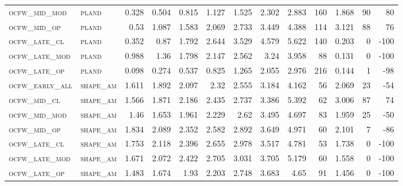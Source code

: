 \begin{landscape}
\begin{center}
\begin{footnotesize}
\begin{longtable}{llrrrrrrrr|rrr}
\textsc{ocfw\_mid\_mod  } & \textsc{pland     }   & 0.328    & 0.504    & 0.815    & 1.127    & 1.525    & 2.302    & 2.883    & 160    & 1.868         & 90            & 80              \\
\textsc{ocfw\_mid\_op   } & \textsc{pland     }   & 0.53     & 1.087    & 1.583    & 2.069    & 2.733    & 3.449    & 4.388    & 114    & 3.121         & 88            & 76              \\
\textsc{ocfw\_late\_cl  } & \textsc{pland     }   & 0.352    & 0.87     & 1.792    & 2.644    & 3.529    & 4.579    & 5.622    & 140    & 0.203         & 0             & -100            \\
\textsc{ocfw\_late\_mod } & \textsc{pland     }   & 0.988    & 1.36     & 1.798    & 2.147    & 2.562    & 3.24     & 3.958    & 88     & 0.131         & 0             & -100            \\
\textsc{ocfw\_late\_op  } & \textsc{pland     }   & 0.098    & 0.274    & 0.537    & 0.825    & 1.265    & 2.055    & 2.976    & 216    & 0.144         & 1             & -98             \\
\textsc{ocfw\_early\_all} & \textsc{shape\_am }   & 1.611    & 1.892    & 2.097    & 2.32     & 2.555    & 3.184    & 4.162    & 56     & 2.069         & 23            & -54             \\
\textsc{ocfw\_mid\_cl   } & \textsc{shape\_am }   & 1.566    & 1.871    & 2.186    & 2.435    & 2.737    & 3.386    & 5.392    & 62     & 3.006         & 87            & 74              \\
\textsc{ocfw\_mid\_mod  } & \textsc{shape\_am }   & 1.46     & 1.653    & 1.961    & 2.229    & 2.62     & 3.495    & 4.697    & 83     & 1.959         & 25            & -50             \\
\textsc{ocfw\_mid\_op   } & \textsc{shape\_am }   & 1.834    & 2.089    & 2.352    & 2.582    & 2.892    & 3.649    & 4.971    & 60     & 2.101         & 7             & -86             \\
\textsc{ocfw\_late\_cl  } & \textsc{shape\_am }   & 1.753    & 2.118    & 2.396    & 2.655    & 2.978    & 3.517    & 4.781    & 53     & 1.738         & 0             & -100            \\
\textsc{ocfw\_late\_mod } & \textsc{shape\_am }   & 1.671    & 2.072    & 2.422    & 2.705    & 3.031    & 3.705    & 5.179    & 60     & 1.558         & 0             & -100            \\
\textsc{ocfw\_late\_op  } & \textsc{shape\_am }   & 1.483    & 1.674    & 1.93     & 2.203    & 2.748    & 3.683    & 4.65     & 91     & 1.456         & 0             & -100            \\

\end{longtable}
\end{footnotesize}
\end{center}
\end{landscape}
